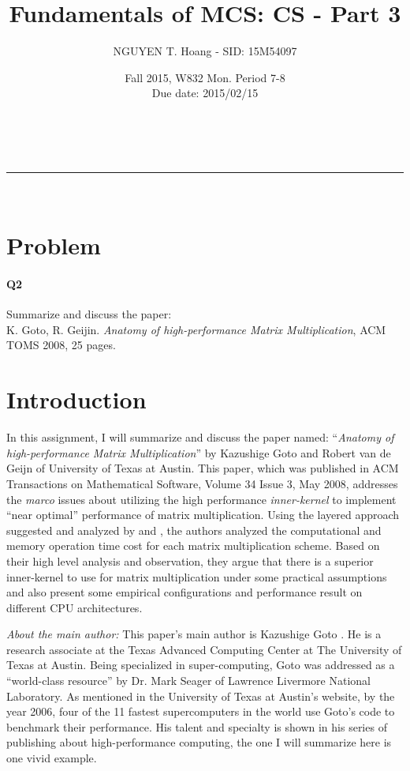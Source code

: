\documentclass[a4paper,12pt]{article}
\makeatletter
\newcommand{\linia}{\rule{\linewidth}{0.5pt}}
\renewcommand{\maketitle} {
\begin{center}
\vspace{2ex}
{\huge \textsc{\@title}}
\vspace{1ex}
\\
\linia\\
\@author \hfill \@date
\vspace{4ex}
\end{center}
}
\makeatother
\begin{document}

\title{Fundamentals of MCS: CS - Part 3}

\author{NGUYEN T. Hoang - SID: 15M54097}

\date{Fall 2015, W832 Mon. Period 7-8 \\ \hfill Due date: 2015/02/15}

\maketitle

\vspace{10em}
\section*{Problem}
\noindent
\paragraph{Q2} Summarize and discuss the paper: \\
\hspace{3em} K. Goto, R. Geijin. \emph{Anatomy of high-performance Matrix Multiplication}, ACM TOMS 2008, 25 pages.
\pagebreak




\section{Introduction}

\noindent
In this assignment, I will summarize and discuss the paper named: ``\emph{Anatomy of high-performance Matrix Multiplication}'' by Kazushige Goto and Robert van de Geijn of University of Texas at Austin. This paper, which was published in ACM Transactions on Mathematical Software, Volume 34 Issue 3, May 2008, addresses the \emph{marco} issues about utilizing the high performance \emph{inner-kernel} to implement ``near optimal'' performance of matrix multiplication. Using the layered approach suggested and analyzed by \cite{gunnels2001} and \cite{gunnels2005}, the authors analyzed the computational and memory operation time cost for each matrix multiplication scheme. Based on their high level analysis and observation, they argue that there is a superior inner-kernel to use for matrix multiplication under some practical assumptions and also present some empirical configurations and performance result on different CPU architectures.

\emph{About the main author: } This paper's main author is Kazushige Goto \cite{gototx}. He is a research associate at the Texas Advanced Computing Center at The University of Texas at Austin. Being specialized in super-computing, Goto was addressed as a ``world-class resource'' by Dr. Mark Seager of Lawrence Livermore National Laboratory. As mentioned in the University of Texas at Austin's website, by the year 2006, four of the 11 fastest supercomputers in the world use Goto's code to benchmark their performance. His talent and specialty is shown in his series of publishing about high-performance computing, the one I will summarize here is one vivid example.
\end{document}
